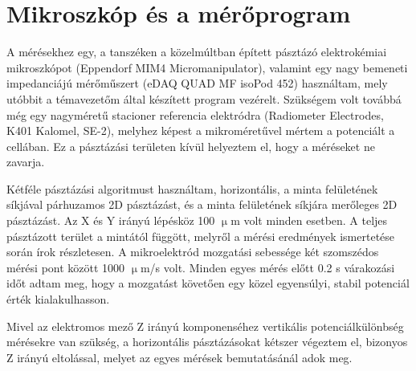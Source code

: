 \section{Mikroszkóp és a mérőprogram}

A mérésekhez egy, a tanszéken a közelmúltban épített pásztázó elektrokémiai mikroszkópot (Eppendorf MIM4 Micromanipulator), valamint egy nagy bemeneti impedanciájú mérőműszert (eDAQ QUAD MF isoPod 452) használtam, mely utóbbit a témavezetőm által készített program vezérelt. Szükségem volt továbbá még egy nagyméretű stacioner referencia elektródra (Radiometer Electrodes, K401 Kalomel, SE-2), melyhez képest a mikroméretűvel mértem a potenciált a cellában. Ez a pásztázási területen kívül helyeztem el, hogy a méréseket ne zavarja. 

Kétféle pásztázási algoritmust használtam, horizontális, a minta felületének síkjával párhuzamos 2D pásztázást, és a minta felületének síkjára merőleges 2D pásztázást. Az X és Y irányú lépésköz 100 $\upmu$m volt minden esetben. A teljes pásztázott terület a mintától függött, melyről a mérési eredmények ismertetése során írok részletesen. A mikroelektród mozgatási sebessége két szomszédos mérési pont között 1000 $\upmu$m/s volt. Minden egyes mérés előtt 0.2 s várakozási időt adtam meg, hogy a mozgatást követően egy közel egyensúlyi, stabil potenciál érték kialakulhasson.  

Mivel az elektromos mező Z irányú komponenséhez vertikális potenciálkülönbség mérésekre van szükség, a horizontális pásztázásokat kétszer végeztem el, bizonyos Z irányú eltolással, melyet az egyes mérések bemutatásánál adok meg.

